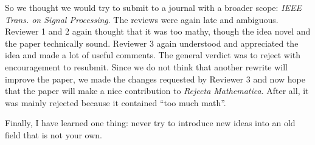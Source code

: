 \documentclass[11pt]{article}
\begin{document}
So we thought we would try to submit to a journal with a broader scope: {\em IEEE Trans. on Signal Processing}. The reviews were again late and ambiguous. Reviewer 1 and 2 again thought that it was too mathy, though the idea novel and the paper technically sound. Reviewer 3 again understood and appreciated the idea and made a lot of useful comments. The general verdict was to reject with encouragement to resubmit. Since we do not think that another rewrite will improve the paper,  we made the changes requested by Reviewer 3 and now hope that the paper will make a nice contribution to {\em Rejecta Mathematica}. After all, it was mainly rejected because it contained ``too much math''.

Finally, I have learned one thing: never try to introduce new ideas into an old field that is not your own.
\end{document}
